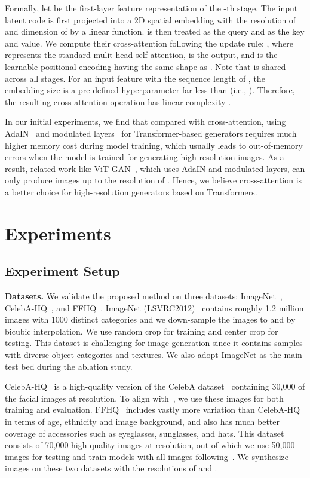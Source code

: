 \documentclass{article}
\newcommand{\p}[1]{\textbf{#1.}}
\begin{document}
Formally, let  be the first-layer feature representation of the -th stage. The input latent code  is first projected into a 2D spatial embedding  with the resolution of  and dimension of  by a linear function.  is then treated as the query and  as the key and value. We compute their cross-attention following the update rule: , where  represents the standard mulit-head self-attention,  is the output, and  is the learnable positional encoding having the same shape as . Note that  is shared across all stages. For an input feature with the sequence length of , the embedding size is a pre-defined hyperparameter far less than  (i.e., ). Therefore, the resulting cross-attention operation has linear complexity .

In our initial experiments, we find that compared with cross-attention, using AdaIN~\cite{huang2017arbitrary} and modulated layers~\cite{karras2020analyzing} for Transformer-based generators requires much higher memory cost during model training, which usually leads to out-of-memory errors when the model is trained for generating high-resolution images. As a result, related work like ViT-GAN~\cite{lee2021vitgan}, which uses AdaIN and modulated layers, can only produce images up to the resolution of . Hence, we believe cross-attention is a better choice for high-resolution generators based on Transformers. \section{Experiments}

\subsection{Experiment Setup}

\p{Datasets} We validate the proposed method on three datasets: ImageNet~\cite{russakovsky2015imagenet}, CelebA-HQ~\cite{karras2018progressive}, and FFHQ~\cite{karras2020analyzing}. ImageNet (LSVRC2012)~\cite{russakovsky2015imagenet} contains roughly 1.2 million images with 1000 distinct categories and we down-sample the images to  and  by bicubic interpolation. We use random crop for training and center crop for testing. This dataset is challenging for image generation since it contains samples with diverse object categories and textures. We also adopt ImageNet as the main test bed during the ablation study.

CelebA-HQ~\cite{karras2018progressive} is a high-quality version of the CelebA dataset~\cite{liu2015faceattributes} containing 30,000 of the facial images at  resolution. To align with~\cite{karras2018progressive}, we use these images for both training and evaluation. FFHQ~\cite{karras2020analyzing} includes vastly more variation than CelebA-HQ in terms of age, ethnicity and image background, and also has much better coverage of accessories such as eyeglasses, sunglasses, and hats. This dataset consists of 70,000 high-quality images at  resolution, out of which we use 50,000 images for testing and train models with all images following~\cite{karras2020analyzing}. We synthesize images on these two datasets with the resolutions of  and . 
\end{document}
